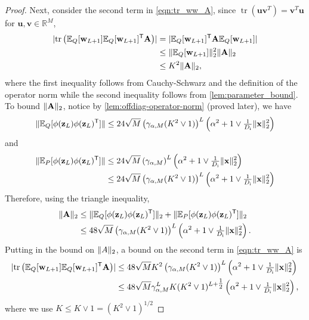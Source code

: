 \documentclass[twoside]{article}
\renewcommand{\ss}[1]{_{\text{#1}}}
\newcommand{\vu}{\mathbf{u}}
\newcommand{\vv}{\mathbf{v}}
\newcommand{\vw}{\mathbf{w}}
\newcommand{\vx}{\mathbf{x}}
\newcommand{\vz}{\mathbf{z}}
\newcommand{\mA}{\mathbf{A}}
\newcommand{\E}{\mathbb{E}}
\newcommand{\T}{\text{\textsf{T}}}
\newcommand{\opspace}{}
\newcommand{\tr}{\operatorname{tr}\opspace}
\renewcommand{\ss}[1]{_{\text{#1}}}        %
\DeclarePairedDelimiter\norm{\|}{\|}             %
\DeclarePairedDelimiter\abs{|}{|}                %
\theoremstyle{theoremstyle}
\begin{document}
\begin{proof}
Next, consider the second term in \cref{eqn:tr_ww_A}, since $\tr(\vu \vv^T) = \vv^T \vu$ for $\vu, \vv \in \mathbb{R}^M$,
\begin{align}
    \abs{\tr \left(\E_Q[\vw_{L+1}]\E_Q[\vw_{L+1}]^\T \mA\right)} 
    &= \abs{\E_Q[\vw_{L+1}]^\T \mA \E_Q[\vw_{L+1}]} \\
    &\le \norm{\E_Q[\vw_{L+1}]}_2^2 \norm{\mA}_2 \\
    &\le K^2 \norm{\mA}_2,
\end{align}
where the first inequality follows from Cauchy-Schwarz and the definition of the operator norm while the second inequality follows from \cref{lem:parameter_bound}.
To bound $\norm{\mA}_2$, notice by \cref{lem:offdiag-operator-norm} (proved later), we have
\begin{align}
    \norm{\E_{Q}[\phi(\vz_L) \phi(\vz_L)^\T]}
    \leq 24\sqrt{M} \left(\gamma_{\alpha,M}(K^2 \lor 1)\right)^{L}\left(\alpha^2 + 1\lor \tfrac1{D\ss{i}}\|\vx\|^2_2\right)
\end{align}
and 
\begin{align}
    \norm{\E_{P}[\phi(\vz_L) \phi(\vz_L)^\T]}
    &\leq 24\sqrt{M} \left(\gamma_{\alpha,M}\right)^{L}\left(\alpha^2 + 1\lor \tfrac1{D\ss{i}}\|\vx\|^2_2\right) \\
    &\leq 24\sqrt{M} \left(\gamma_{\alpha,M}(K^2 \lor 1)\right)^{L}\left(\alpha^2 + 1\lor \tfrac1{D\ss{i}}\|\vx\|^2_2\right) 
\end{align}
Therefore, using the triangle inequality,
\begin{align}
    \norm{\mA}_2
    &\le \norm{\E_{Q}[\phi(\vz_L) \phi(\vz_L)^\T]}_2 + \norm{\E_{P}[\phi(\vz_L) \phi(\vz_L)^\T]}_2 \\
    &\le 48\sqrt{M} \left(\gamma_{\alpha,M}(K^2 \lor 1)\right)^{L}\left(\alpha^2 + 1\lor \tfrac1{D\ss{i}}\|\vx\|^2_2\right).
\end{align}
Putting in the bound on $\norm{A}_2$, a bound on the second term in \cref{eqn:tr_ww_A} is
\begin{align}
    \abs{\tr \left(\E_Q[\vw_{L+1}]\E_Q[\vw_{L+1}]^\T \mA\right)} 
    &\le 48\sqrt{M} K^2 \left(\gamma_{\alpha,M}(K^2 \lor 1)\right)^{L}\left(\alpha^2 + 1\lor \tfrac1{D\ss{i}}\|\vx\|^2_2\right) \\
    &\le 48\sqrt{M} \gamma_{\alpha,M}^L K (K^2 \lor 1)^{L+\tfrac12}\left(\alpha^2 + 1\lor \tfrac1{D\ss{i}}\|\vx\|^2_2\right),
\end{align}
where we use $K \le K \lor 1 = (K^2 \lor 1)^{1/2}$



\end{proof}
\end{document}

